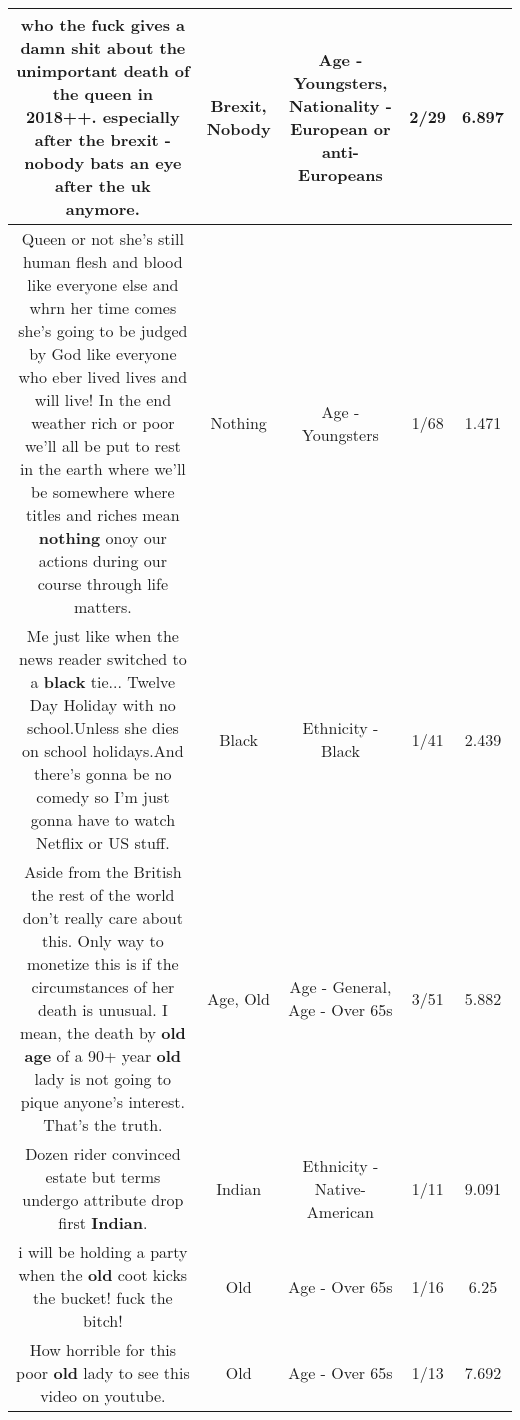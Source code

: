 \documentclass[11pt]{article}
\newlength\mylength
\begin{document}
\begin{center}
\begin{longtable}{|C{.65\mylength}|C{.30\mylength}|C{.12\mylength}|C{.12\mylength}|C{.12\mylength}|}
  \small who the fuck gives a damn shit about the unimportant death of the queen in 2018++. especially after the \textbf{brexit} - \textbf{nobody} bats an eye after the uk anymore.\normalsize   & Brexit, Nobody & Age - Youngsters, Nationality - European or anti-Europeans & 2/29 & 6.897 \\  \hline
  \small Queen or not she's still human flesh and blood like everyone else and whrn her time comes she's going to be judged by God like everyone who eber lived lives and will live! In the end weather rich or poor we'll all be put to rest in the earth where we'll be somewhere where titles and riches mean \textbf{nothing} onoy our actions during our course through life matters.\normalsize   & Nothing & Age - Youngsters & 1/68 & 1.471 \\  \hline
  \small Me just like when the news reader switched to a \textbf{black} tie... Twelve Day Holiday with no school.Unless she dies on school holidays.And there's gonna be no comedy so I'm just gonna have to watch Netflix or US stuff.\normalsize   & Black & Ethnicity - Black & 1/41 & 2.439 \\  \hline
  \small Aside from the British the rest of the world don't really care about this. Only way to monetize this is if the circumstances of her death is unusual. I mean, the death by \textbf{old} \textbf{age} of a 90+ year \textbf{old} lady is not going to pique anyone's interest. That's the truth.\normalsize   & Age, Old & Age - General, Age - Over 65s & 3/51 & 5.882 \\  \hline
  \small Dozen rider convinced estate but terms undergo attribute drop first \textbf{Indian}.\normalsize   & Indian & Ethnicity - Native-American & 1/11 & 9.091 \\  \hline
  \small i will be holding a party when the \textbf{old} coot kicks the bucket! fuck the bitch!\normalsize   & Old & Age - Over 65s & 1/16 & 6.25 \\  \hline
  \small How horrible for this poor \textbf{old} lady to see this video on youtube.\normalsize   & Old & Age - Over 65s & 1/13 & 7.692 \\  \hline

\end{longtable}
\end{center}
\end{document}
